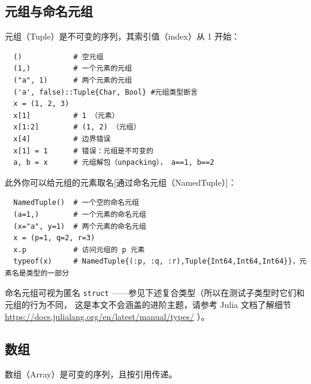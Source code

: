 \documentclass[10pt,a4paper]{article}
\begin{document}
\subsection{元组与命名元组}
元组（Tuple）是不可变的序列，其索引值（index）从 1 开始：
\begin{lstlisting}
  ()            # 空元组
  (1,)          # 一个元素的元组
  ("a", 1)      # 两个元素的元组
  ('a', false)::Tuple{Char, Bool} #元组类型断言
  x = (1, 2, 3)
  x[1]          # 1 （元素）
  x[1:2]        # (1, 2) （元组）
  x[4]          # 边界错误
  x[1] = 1      # 错误：元组是不可变的
  a, b = x      # 元组解包（unpacking）， a==1, b==2
\end{lstlisting}
此外你可以给元组的元素取名[通过命名元组（NamedTuple）]：
\begin{lstlisting}
  NamedTuple()  # 一个空的命名元组
  (a=1,)        # 一个元素的命名元组
  (x="a", y=1)  # 两个元素的命名元组
  x = (p=1, q=2, r=3)
  x.p           # 访问元组的 p 元素
  typeof(x)     # NamedTuple{(:p, :q, :r),Tuple{Int64,Int64,Int64}}，元素名是类型的一部分
\end{lstlisting}
命名元组可视为匿名 \lstinline|struct| ——参见下述复合类型（所以在测试子类型时它们和元组的行为不同，
这是本文不会涵盖的进阶主题，请参考 Julia 文档了解细节 \sloppy   \url{https://docs.julialang.org/en/latest/manual/types/} ）。

\subsection{数组}
数组（Array）是可变的序列，且按引用传递。
\end{document}
